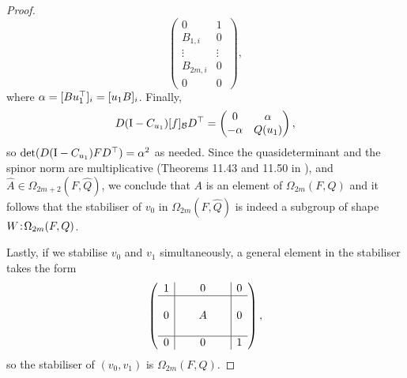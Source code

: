 \begin{proof}
\begin{equation*}
\begin{pmatrix}
	    0 & 1\  \\
	    B_{1,i} & 0\  \\
	    \vdots & \vdots \\
	    B_{2m,i} & 0\  \\
	    0 & 0
	\end{pmatrix},
    \end{equation*}
    where $\alpha = [Bu_1^\top]_i = [u_1B]_i$. Finally, 
    \begin{equation*}
	D(\mathord{\mathrm{I}}-C_{u_1}) [f]_{\mathcal{B}} D^\top = \begin{pmatrix}
	    0 & \alpha \\
	    -\alpha & Q(u_1)
	\end{pmatrix},
    \end{equation*}
    so $\det(D(\mathord{\mathrm{I}}-C_{u_1})FD^\top) = \alpha^2$ as needed. Since the quasideterminant and 
    the spinor norm are multiplicative (Theorems 11.43 and 11.50 in \cite{Taylor}),
    and $\hat{A} \in \Omega_{2m+2}(F,\hat{Q})$, we conclude that $A$ is
    an element of $\Omega_{2m}(F,Q)$ and it follows that the stabiliser
    of $v_0$ in $\Omega_{2m}(F,\hat{Q})$ is indeed a subgroup of shape
    $W\mathord{{\;\!{:}\;\!}}\Omega_{2m}(F,Q)$.
    
    Lastly, if we stabilise $v_0$ and $v_1$ simultaneously, a general element in the
    stabiliser takes the form
    \begin{equation*}
	\left(
	    \begin{array}{c|c|c}
		1 & 0 & 0 \\ \hline 
		 & & \\
		0 &\ \ \ \ \ A\ \ \ \ \  & 0 \\ 
		 & & \\ \hline 
		0 & 0 & 1
	    \end{array}
	\right),
    \end{equation*}
    so the stabiliser of $(v_0,v_1)$ is $\Omega_{2m}(F,Q)$. 
\end{proof}


